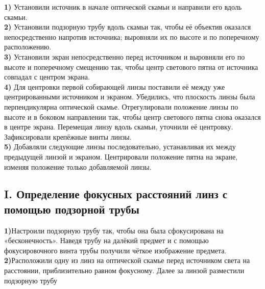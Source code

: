\noindent\textbf{1)} Установили источник в начале оптической скамьи и направили его вдоль скамьи.\\
\textbf{2)} Установили подзорную трубу вдоль скамьи так, чтобы её объектив оказался непосредственно напротив источника; выровняли их по высоте и по поперечному расположению.\\
\textbf{3)} Установили экран непосредственно перед источником и выровняли его по высоте и поперечному смещению так, чтобы центр светового пятна от источника совпадал с центром экрана.\\
\textbf{4)} Для центровки первой собирающей линзы поставили её между уже центрированными источником и экраном. Убедились, что плоскость линзы была перпендикулярна оптической скамье. Отрегулировали положение линзы по высоте и в боковом направлении так, чтобы центр светового пятна снова оказался в центре экрана. Перемещая линзу вдоль скамьи, уточнили её центровку. Зафиксировали крепёжные винты линзы.\\
\textbf{5)} Добавляли следующие линзы последовательно, устанавливая их между предыдущей линзой и экраном. Центрировали положение пятна на экране, изменяя положение только добавляемой линзы.\\

\subsection*{I. Определение фокусных расстояний линз с помощью подзорной трубы}

\indent \textbf{1)}Настроили подзорную трубу так, чтобы она была сфокусирована на «бесконечность». Наведя трубу на далёкий предмет и с помощью фокусировочного винта трубы получили чёткое изображение предмета.\\

\indent \textbf{2)}Расположили одну из линз на оптической скамье перед источником света на расстоянии, приблизительно равном фокусному. Далее за линзой разместили подзорную трубу \\


